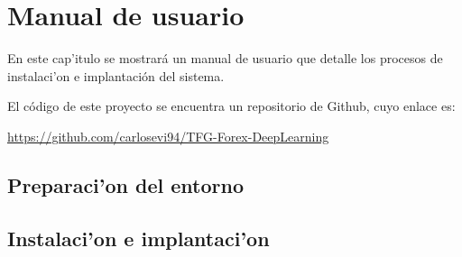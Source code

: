\chapter{Manual de usuario}\label{cap7}
En este cap'itulo se mostrará un manual de usuario que detalle los procesos de instalaci'on e implantación del sistema.

El código de este proyecto se encuentra un repositorio de Github, cuyo enlace es: 

\url{https://github.com/carlosevi94/TFG-Forex-DeepLearning}

\section{Preparaci'on del entorno}\label{sec:productores}



\section{Instalaci'on e implantaci'on}\label{sec:instalacion}






